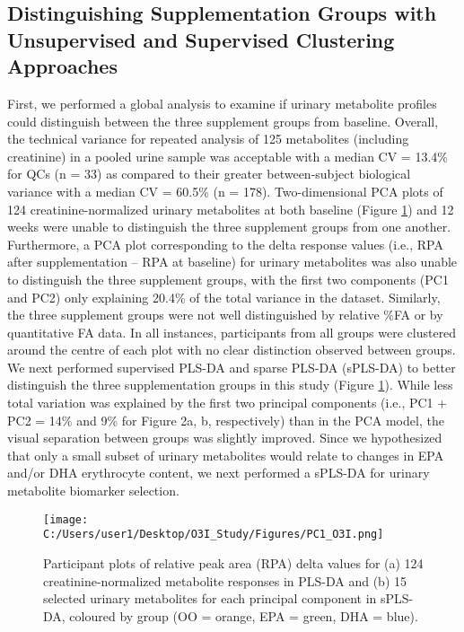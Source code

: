 \documentclass[journal=jacsat,manuscript=article]{achemso}
\begin{document}
\subsection{Distinguishing Supplementation Groups with Unsupervised and
Supervised Clustering
Approaches}\label{distinguishing-supplementation-groups-with-unsupervised-and-supervised-clustering-approaches}

First, we performed a global analysis to examine if urinary metabolite
profiles could distinguish between the three supplement groups from
baseline. Overall, the technical variance for repeated analysis of 125
metabolites (including creatinine) in a pooled urine sample was
acceptable with a median CV = 13.4\% for QCs (n = 33) as compared to
their greater between-subject biological variance with a median CV =
60.5\% (n = 178). Two-dimensional PCA plots of 124 creatinine-normalized
urinary metabolites at both baseline (Figure \ref{fig:fig2}) and 12
weeks were unable to distinguish the three supplement groups from one
another. Furthermore, a PCA plot corresponding to the delta response
values (i.e., RPA after supplementation -- RPA at baseline) for urinary
metabolites was also unable to distinguish the three supplement groups,
with the first two components (PC1 and PC2) only explaining 20.4\% of
the total variance in the dataset. Similarly, the three supplement
groups were not well distinguished by relative \%FA or by quantitative
FA data. In all instances, participants from all groups were clustered
around the centre of each plot with no clear distinction observed
between groups. We next performed supervised PLS-DA and sparse PLS-DA
(sPLS-DA) to better distinguish the three supplementation groups in this
study (Figure \ref{fig:fig2}). While less total variation was explained
by the first two principal components (i.e., PC1 + PC2 = 14\% and 9\%
for Figure 2a, b, respectively) than in the PCA model, the visual
separation between groups was slightly improved. Since we hypothesized
that only a small subset of urinary metabolites would relate to changes
in EPA and/or DHA erythrocyte content, we next performed a sPLS-DA for
urinary metabolite biomarker selection.

\begin{figure}
\centering
\texttt{[image: C:/Users/user1/Desktop/O3I\_Study/Figures/PC1\_O3I.png]}
\caption{Participant plots of relative peak area (RPA) delta values for
(a) 124 creatinine-normalized metabolite responses in PLS-DA and (b) 15
selected urinary metabolites for each principal component in sPLS-DA,
coloured by group (OO = orange, EPA = green, DHA =
blue).}\label{fig:fig2}
\end{figure}
\end{document}

